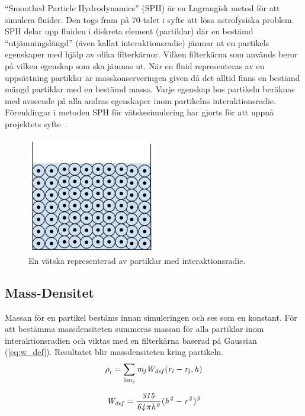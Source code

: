 \documentclass[a4paper,12pt,oneside,final]{extarticle}
\begin{document}
“Smoothed Particle Hydrodynamics” (SPH)\cite{sph} är en Lagrangisk metod för att simulera fluider.
Den togs fram på 70-talet i syfte att lösa astrofysiska problem.
SPH delar upp fluiden i diskreta element (partiklar) där en bestämd “utjämningslängd” (även kallat interaktionsradie) jämnar ut en partikels egenskaper med hjälp av olika filterkärnor.
Vilken filterkärna som används beror på vilken egenskap som ska jämnas ut.
När en fluid representeras av en uppsättning partiklar är masskonserveringen given då det alltid finns en bestämd mängd partiklar med en bestämd massa.
Varje egenskap hos partikeln beräknas med avseende på alla andras egenskaper inom partikelns interaktionsradie. Förenklingar i metoden SPH för vätskesimulering har gjorts för att uppnå projektets syfte~\cite{kelager}\cite{vesterlund}.
\begin{figure}[H]
  \centering
    \includegraphics[width=0.5\textwidth]{bilder/partiklar_vila}
  \caption{En vätska representerad av partiklar med interaktionsradie.}
\end{figure}

\subsection{Mass-Densitet}
Massan för en partikel bestäms innan simuleringen och ses som en konstant.
För att bestämma massdensiteten summeras massan för alla partiklar inom interaktionsradien och viktas med en filterkärna baserad på Gaussian (\ref{eq:w_def}).
Resultatet blir massdensiteten kring partikeln.
\begin{equation}
\rho^{}_{i} = \sum_{\lim_{j}} {\it m_j W_{def} (r_i-r_j,h)}
\end{equation}

\begin{equation} \label{eq:w_def}
{\it W_{def} = \frac{315}{64 \pi h^9}(h^2-r^2)^3}
\end{equation}
\end{document}
